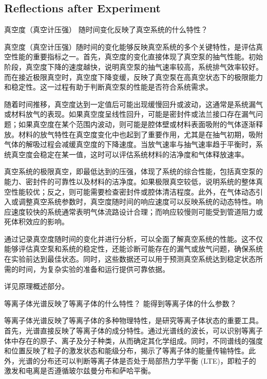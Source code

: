 

\subsection{Reflections after Experiment}

\begin{question}
	真空度（真空计压强） 随时间变化反映了真空系统的什么特性？
\end{question}
真空度（真空计压强）随时间的变化能够反映真空系统的多个关键特性，是评估真空性能的重要指标之一。首先，真空度的变化直接体现了真空泵的抽气性能。初始阶段，真空度下降的速度越快，说明真空泵的抽气速率较高，系统排气效率较好。而在接近极限真空时，真空度下降变缓，反映了真空泵在高真空状态下的极限能力和稳定性。这一过程有助于判断真空泵的性能是否符合系统需求。

随着时间推移，真空度达到一定值后可能出现缓慢回升或波动，这通常是系统漏气或材料放气的表现。如果真空度呈线性回升，可能是密封件或法兰接口存在漏气问题；如果真空度在某个范围内波动，则可能是腔体壁或材料表面吸附的气体逐渐释放。材料的放气特性在真空度变化中也起到了重要作用，尤其是在抽气初期，吸附气体的解吸过程会减缓真空度的下降速度。当放气速率与抽气速率趋于平衡时，系统真空度会稳定在某一值，这时可以评估系统材料的洁净度和气体释放速率。

真空系统的极限真空，即最低达到的压强，体现了系统的综合性能，包括真空泵的能力、密封件的可靠性以及材料的洁净度。如果极限真空较低，说明系统的整体真空性能较优；反之，则可能需要检查密封件或腔体清洁程度。此外，在气体动态引入或调整真空系统参数时，真空度随时间的响应速度可以反映系统的动态特性。响应速度较快的系统通常表明气体流路设计合理；而响应较慢则可能受到管道阻力或死体积效应的影响。

通过记录真空度随时间的变化并进行分析，可以全面了解真空系统的性能。这不仅能够评估真空泵和系统的稳定性，还能诊断可能存在的漏气或放气问题，确保系统在实验前达到最佳状态。同时，这些数据还可以用于预测真空系统达到稳定状态所需的时间，为复杂实验的准备和运行提供可靠依据。

详见原理概述部分。

\begin{question}
	等离子体光谱反映了等离子体的什么特性？ 能得到等离子体的什么参数？
\end{question}
等离子体光谱反映了等离子体的多种物理特性，是研究等离子体状态的重要工具。首先，光谱直接反映了等离子体的成分特性。通过光谱线的波长，可以识别等离子体中存在的原子、离子及分子种类，从而确定其化学组成。同时，不同谱线的强度和位置反映了粒子的激发状态和能级分布，揭示了等离子体的能量传输特性。此外，光谱的分布还可以判断等离子体是否处于局部热力学平衡 (LTE)，即粒子的激发和电离是否遵循玻尔兹曼分布和萨哈平衡。

